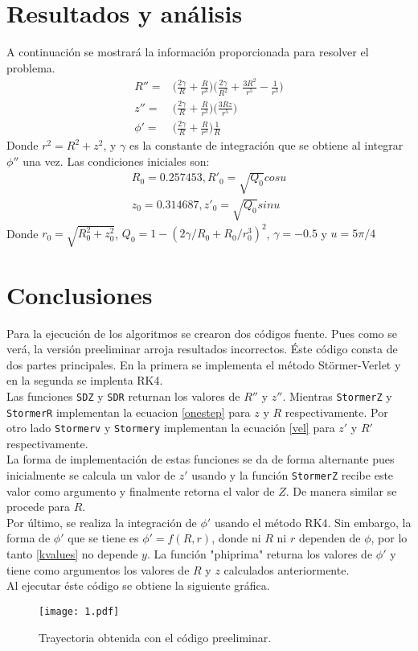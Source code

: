 \documentclass[10pt,twocolumn]{article}
\begin{document}
\section{Resultados y análisis}
A continuación se mostrará la información proporcionada \cite{problem} para resolver el problema.
\begin{equation}\label{problem}
\begin{split}
R''=&\Big(\frac{2\gamma}{R}+\frac{R}{r^3}\Big)\Big(\frac{2\gamma}{R^2}+\frac{3R^2}{r^5}-\frac{1}{r^3}\Big)\\
z''=&\Big(\frac{2\gamma}{R}+\frac{R}{r^3}\Big)\Big(\frac{3Rz}{r^5}\Big)\\
\phi'=&\Big(\frac{2\gamma}{R}+\frac{R}{r^3}\Big)\frac{1}{R}
\end{split}
\end{equation}
Donde $r^2=R^2+z^2$, y $\gamma$ es la constante de integración que se obtiene al integrar $\phi''$ una vez.
Las condiciones iniciales son: 
\begin{equation}
\begin{split}
R_0=0.257453, R'_0=\sqrt{Q_0}cos u\\ z_0=0.314687,  z'_0=\sqrt{Q_0}sin u
\end{split}
\end{equation} 
Donde $r_0=\sqrt{R_0^2+z_0^2}$, $Q_0=1-(2\gamma/R_0+R_0/r_0^3)^2$, $\gamma=-0.5$ y $u=5\pi/4$
\section{Conclusiones}
Para la ejecución de los algoritmos se crearon dos códigos fuente. Pues como se verá, la versión preeliminar arroja resultados incorrectos.
Éste código consta de dos partes principales. En la primera se implementa el método Störmer-Verlet y en la segunda se implenta RK4.\\
Las funciones \texttt{SDZ} y \texttt{SDR} returnan los valores de $R''$ y $z''$.
Mientras \texttt{StormerZ} y \texttt{StormerR} implementan la ecuacion \eqref{onestep} para $z$ y $R$ respectivamente.
Por otro lado \texttt{Stormerv} y \texttt{Stormery} implementan la ecuación \eqref{vel} para $z'$ y $R'$ respectivamente. \\
La forma de implementación de estas funciones se da de forma alternante pues inicialmente se calcula un valor de $z'$ usando  y la función \texttt{StormerZ} recibe este valor como argumento y finalmente retorna el valor de $Z$. De manera similar se procede para $R$.\\
Por último, se realiza la integración de $\phi'$ usando el método RK4. Sin embargo, la forma de $\phi'$ que se tiene es $\phi'=f(R,r)$, donde ni $R$ ni $r$ dependen de $\phi$, por lo tanto \eqref{kvalues} no depende $y$.
La función "phiprima" returna los valores de $\phi'$ y tiene como argumentos los valores de $R$ y $z$ calculados anteriormente.\\
Al ejecutar éste código se obtiene la siguiente gráfica.
\begin{figure}[H]
\label{fig:1}
  \texttt{[image: 1.pdf]}
  \caption{Trayectoria obtenida con el código preeliminar.}
\end{figure}
\end{document}
